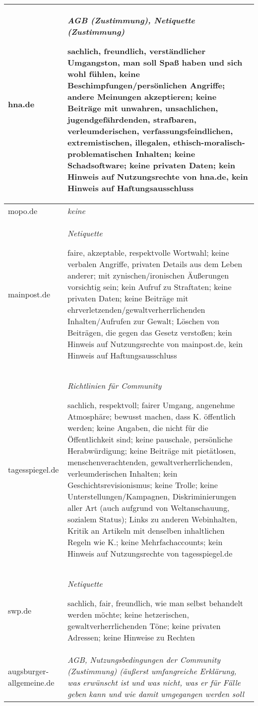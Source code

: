 \begin{landscape}
\begin{longtable}{lp{170mm}}
hna.de & \emph{AGB (Zustimmung), Netiquette (Zustimmung)}

	sachlich, freundlich, verständlicher Umgangston, man soll Spaß haben und
	sich wohl fühlen, keine Beschimpfungen/persönlichen Angriffe; andere
	Meinungen akzeptieren; keine Beiträge mit
	un\-wah\-ren, un\-sach\-li\-chen, ju\-gend\-ge\-fähr\-den\-den, straf\-ba\-ren, ver\-leum\-de\-ri\-schen, ver\-fas\-sungs\-feind\-li\-chen, ex\-tre\-mis\-ti\-schen, il\-le\-ga\-len, ethisch-mo\-ra\-lisch-pro\-ble\-ma\-ti\-schen
	Inhalten; keine Schadsoftware; keine privaten Daten; kein Hinweis auf
	Nutzungsrechte von hna.de, kein Hinweis auf
	Haftungsausschluss\tabularnewline\hline

mopo.de &  \emph{keine}\tabularnewline\hline

mainpost.de& \emph{Netiquette}

	faire, akzeptable, respektvolle Wortwahl; keine verbalen Angriffe,
	privaten Details aus dem Leben anderer; mit zynischen/ironischen
	Äußerungen vorsichtig sein; kein Aufruf zu Straftaten; keine privaten
	Daten; keine Beiträge mit ehrverletzenden/gewaltverherrlichenden
	Inhalten/Aufrufen zur Gewalt; Löschen von Beiträgen, die gegen das
	Gesetz verstoßen; kein Hinweis auf Nutzungsrechte von mainpost.de, kein
	Hinweis auf Haftungsausschluss\tabularnewline\hline

tagesspiegel.de & \emph{Richtlinien für Community}

	sachlich, respektvoll; fairer Umgang, angenehme Atmosphäre; bewusst
	machen, dass K. öffentlich werden; keine Angaben, die nicht für die
	Öffentlichkeit sind; keine pauschale, persönliche Herabwürdigung; keine
	Beiträge mit
	pietätlosen, menschenverachtenden, gewaltverherrlichenden, verleumderischen
	Inhalten; kein Geschichtsrevisionismus; keine Trolle; keine
	Unterstellungen/Kampagnen, Diskriminierungen aller Art (auch aufgrund von
	Weltanschauung, sozialem Status); Links zu anderen Webinhalten, Kritik an
	Artikeln mit denselben inhaltlichen Regeln wie K.; keine
	Mehrfachaccounts; kein Hinweis auf Nutzungsrechte von
	tagesspiegel.de\tabularnewline\hline

swp.de & \emph{Netiquette}

	sachlich, fair, freundlich, wie man selbst behandelt werden möchte;
	keine het\-ze\-ri\-schen, ge\-walt\-ver\-herr\-li\-chen\-den Töne; keine privaten Adressen;
	keine Hinweise zu Rechten\tabularnewline\hline


augsburger-allgemeine.de & \emph{AGB, Nutzungsbedingungen der Community
  (Zustimmung) (äußerst umfangreiche Erklärung, was erwünscht ist und was nicht,
  was er für Fälle geben kann und wie damit umgegangen werden soll}


\end{longtable}
\end{landscape}
